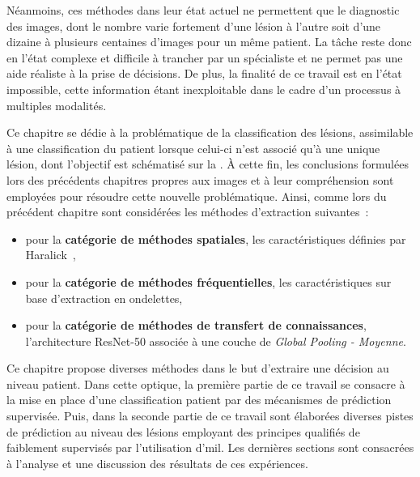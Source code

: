 Néanmoins, ces méthodes dans leur état actuel ne permettent que le diagnostic des images, dont le nombre varie fortement d'une lésion à l'autre soit d'une dizaine à plusieurs centaines d'images pour un même patient. La tâche reste donc en l'état complexe et difficile à trancher par un spécialiste et ne permet pas une aide réaliste à la prise de décisions. De plus, la finalité de ce travail est en l'état impossible, cette information étant inexploitable dans le cadre d'un processus à multiples modalités.\par

Ce chapitre se dédie à la problématique de la classification des lésions, assimilable à une classification du patient lorsque celui-ci n'est associé qu'à une unique lésion, dont l'objectif est schématisé sur la . À cette fin, les conclusions formulées lors des précédents chapitres propres aux images et à leur compréhension sont employées pour résoudre cette nouvelle problématique. Ainsi, comme lors du précédent chapitre sont considérées les méthodes d'extraction suivantes~:
\begin{itemize}
    \item pour la \textbf{catégorie de méthodes spatiales}, les caractéristiques définies par Haralick~,
    \item pour la \textbf{catégorie de méthodes fréquentielles}, les caractéristiques sur base d'extraction en ondelettes,
    \item pour la \textbf{catégorie de méthodes de transfert de connaissances}, l'architecture ResNet-50 associée à une couche de \textit{Global Pooling - Moyenne}.
\end{itemize}\par\par

Ce chapitre propose diverses méthodes dans le but d'extraire une décision au niveau patient. Dans cette optique, la première partie de ce travail se consacre à la mise en place d'une classification patient par des mécanismes de prédiction supervisée. Puis, dans la seconde partie de ce travail sont élaborées diverses pistes de prédiction au niveau des lésions employant des principes qualifiés de faiblement supervisés par l'utilisation d'\gls{mil}. Les dernières sections sont consacrées à l'analyse et une discussion des résultats de ces expériences.\par

